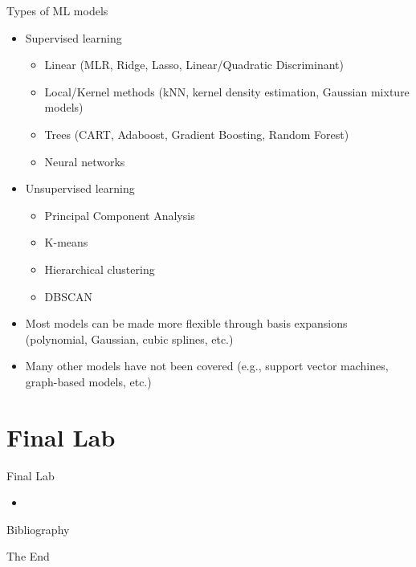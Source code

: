 \documentclass{beamer}
\begin{document}
\begin{frame}{Types of ML models}
    \begin{itemize}
        \item Supervised learning
        \begin{itemize}
            \item Linear (MLR, Ridge, Lasso, Linear/Quadratic Discriminant)
            \item Local/Kernel methods (kNN, kernel density estimation, Gaussian mixture models)
            \item Trees (CART, Adaboost, Gradient Boosting, Random Forest)
            \item Neural networks
        \end{itemize}
        \item Unsupervised learning
        \begin{itemize}
            \item Principal Component Analysis
            \item K-means
            \item Hierarchical clustering
            \item DBSCAN
        \end{itemize}
        \item Most models can be made more flexible through basis expansions (polynomial, Gaussian, cubic splines, etc.)
        \item Many other models have not been covered (e.g., support vector machines, graph-based models, etc.)
    \end{itemize}
\end{frame}


\section{Final Lab}


\begin{frame}{Final Lab}
    \begin{itemize}
        \item 
    \end{itemize}
\end{frame}


\begin{frame}{Bibliography}
    
    
\end{frame}


\begin{frame}
    \Huge{\centerline{The End}}
\end{frame}
\end{document}
